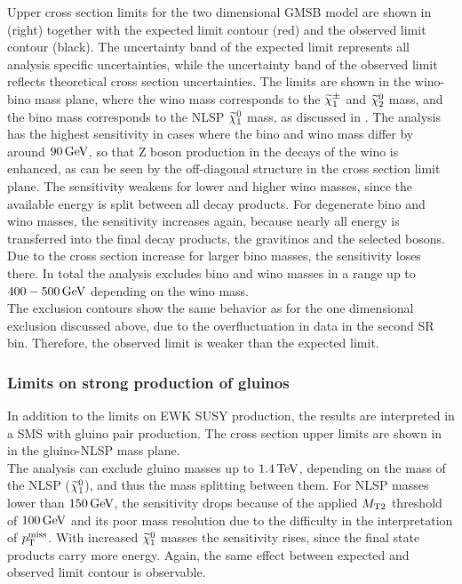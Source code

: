 Upper cross section limits for the two dimensional GMSB model are shown in  (right) together with the expected limit contour (red) and the observed limit contour (black). The uncertainty band of the expected limit represents all analysis specific uncertainties, while the uncertainty band of the observed limit reflects theoretical cross section uncertainties. The limits are shown in the wino-bino mass plane, where the wino mass corresponds to the $\widetilde{\chi}^\pm_{1}$ and $\widetilde{\chi}^{0}_{2}$ mass, and the bino mass corresponds to the NLSP $\widetilde{\chi}^{0}_{1}$ mass, as discussed in . The analysis has the highest sensitivity in cases where the bino and wino mass differ by around $90\,\text{Ge\hspace{-.08em}V}$, so that Z boson production in the decays of the wino is enhanced, as can be seen by the off-diagonal structure in the cross section limit plane. The sensitivity weakens for lower and higher wino masses, since the available energy is split between all decay products. For degenerate bino and wino masses, the sensitivity increases again, because nearly all energy is transferred into the final decay products, the gravitinos and the selected bosons. Due to the cross section increase for larger bino masses, the sensitivity loses there. In total the analysis excludes bino and wino masses in a range up to $400-500\,\text{Ge\hspace{-.08em}V}$ depending on the wino mass.\\
The exclusion contours show the same behavior as for the one dimensional exclusion discussed above, due to the overfluctuation in data in the second SR bin. Therefore, the observed limit is weaker than the expected limit.


\subsubsection*{Limits on strong production of gluinos}
In addition to the limits on EWK SUSY production, the results are interpreted in a SMS with gluino pair production. The cross section upper limits are shown in  in the gluino-NLSP mass plane.\\
The analysis can exclude gluino masses up to $1.4\,\text{Te\hspace{-.08em}V}$, depending on the mass of the NLSP ($\widetilde{\chi}^{0}_{1}$), and thus the mass splitting between them. For NLSP masses lower than $150\,\text{Ge\hspace{-.08em}V}$, the sensitivity drops because of the applied $M_{\mathrm{T2}}$ threshold of $100\,\text{Ge\hspace{-.08em}V}$ and its poor mass resolution due to the difficulty in the interpretation of $p_{\mathrm{T}}^\text{miss}$. With increased $\widetilde{\chi}^{0}_{1}$ masses the sensitivity rises, since the final state products carry more energy. Again, the same effect between expected and observed limit contour is observable.

